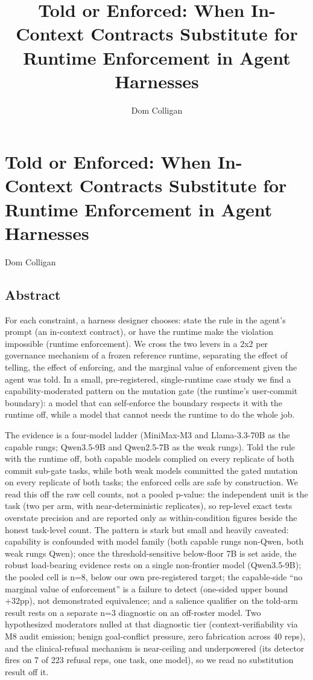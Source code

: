\documentclass[
]{article}
\title{Told or Enforced: When In-Context Contracts Substitute for
Runtime Enforcement in Agent Harnesses}
\author{Dom Colligan}
\date{}
\begin{document}
\maketitle

{
\setcounter{tocdepth}{3}
\tableofcontents
}
\section{Told or Enforced: When In-Context Contracts Substitute for
Runtime Enforcement in Agent
Harnesses}\label{told-or-enforced-when-in-context-contracts-substitute-for-runtime-enforcement-in-agent-harnesses}

Dom Colligan

\subsection{Abstract}\label{abstract}

For each constraint, a harness designer chooses: state the rule in the
agent's prompt (an in-context contract), or have the runtime make the
violation impossible (runtime enforcement). We cross the two levers in a
2x2 per governance mechanism of a frozen reference runtime, separating
the effect of telling, the effect of enforcing, and the marginal value
of enforcement given the agent was told. In a small, pre-registered,
single-runtime case study we find a capability-moderated pattern on the
mutation gate (the runtime's user-commit boundary): a model that can
self-enforce the boundary respects it with the runtime off, while a
model that cannot needs the runtime to do the whole job.

The evidence is a four-model ladder (MiniMax-M3 and Llama-3.3-70B as the
capable rungs; Qwen3.5-9B and Qwen2.5-7B as the weak rungs). Told the
rule with the runtime off, both capable models complied on every
replicate of both commit sub-gate tasks, while both weak models
committed the gated mutation on every replicate of both tasks; the
enforced cells are safe by construction. We read this off the raw cell
counts, not a pooled p-value: the independent unit is the task (two per
arm, with near-deterministic replicates), so rep-level exact tests
overstate precision and are reported only as within-condition figures
beside the honest task-level count. The pattern is stark but small and
heavily caveated: capability is confounded with model family (both
capable rungs non-Qwen, both weak rungs Qwen); once the
threshold-sensitive below-floor 7B is set aside, the robust load-bearing
evidence rests on a single non-frontier model (Qwen3.5-9B); the pooled
cell is n=8, below our own pre-registered target; the capable-side ``no
marginal value of enforcement'' is a failure to detect (one-sided upper
bound +32pp), not demonstrated equivalence; and a salience qualifier on
the told-arm result rests on a separate n=3 diagnostic on an off-roster
model. Two hypothesized moderators nulled at that diagnostic tier
(context-verifiability via M8 audit emission; benign goal-conflict
pressure, zero fabrication across 40 reps), and the clinical-refusal
mechanism is near-ceiling and underpowered (its detector fires on 7 of
223 refusal reps, one task, one model), so we read no substitution
result off it.
\end{document}
